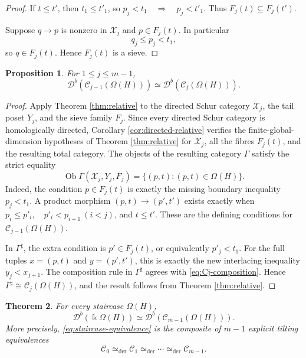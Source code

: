 \documentclass[12pt,a4paper,english,reqno]{amsart}
\theoremstyle{plain}
\newtheorem{theorem}{Theorem}[section]
\newtheorem{proposition}[theorem]{Proposition}
\theoremstyle{definition}
\newcommand{\kk}{\Bbbk}
\newcommand{\C}{\mathcal C}
\newcommand{\X}{\mathcal X}
\newcommand{\G}{\Gamma}
\newcommand{\Gs}{\Gamma^{\sharp}}
\newcommand{\Db}[1]{{\mathscr D}^b(#1)}
\begin{document}
\begin{proof}
If $t\leq t'$, then $t_1\leq t'_1$, so $p_j<t_1\quad\Longrightarrow\quad p_j<t'_1$.
Thus $F_j(t)\subseteq F_j(t')$.

Suppose $q\to p$ is nonzero in $\X_j$ and $p\in F_j(t)$.  In particular
\[
 q_j\leq p_j<t_1,
\]
so $q\in F_j(t)$.  Hence $F_j(t)$ is a sieve.
\end{proof}

\begin{proposition}
\label{prop:one-step}
For $1\leq j\leq m-1$,
\[
 \Db{\C_{j-1}(\Omega(H))}\simeq\Db{\C_j(\Omega(H))}.
\]
\end{proposition}

\begin{proof}
Apply Theorem \ref{thm:relative} to the directed Schur category $\X_j$, the tail
poset $Y_j$, and the sieve family $F_j$.  Since every directed Schur
category is homologically directed, Corollary \ref{cor:directed-relative}
verifies the finite-global-dimension hypotheses of Theorem \ref{thm:relative} for
$\X_j$, all the fibres $F_j(t)$, and the resulting total category.
The objects of the resulting
category $\G$ satisfy the strict equality
\[
 \operatorname{Ob}\G(\X_j,Y_j,F_j)
 =
 \{(p,t):(p,t)\in\Omega(H)\}.
\]
Indeed, the condition $p\in F_j(t)$ is exactly the missing boundary
inequality $p_j<t_1$. A product morphism $(p,t)\to(p',t')$ exists exactly when
 $p_i\leq p'_i,\quad p'_i<p_{i+1}\ (i<j)$, and $t\leq t'$.
These are the defining conditions for
$\C_{j-1}(\Omega(H))$.

In $\Gs$, the extra condition is $p'\in F_j(t)$, or equivalently
$p'_j<t_1$.
For the full tuples $x=(p,t)$ and $y=(p',t')$, this is exactly the new
interlacing inequality $y_j<x_{j+1}$.
The composition rule in $\Gs$ agrees with
\eqref{eq:Cj-composition}.  Hence
$\Gs\cong\C_j(\Omega(H))$, and the result follows from Theorem 
\ref{thm:relative}.
\end{proof}

\begin{theorem}
\label{thm:staircase}
For every staircase $\Omega(H)$,
\begin{equation}
 \Db{\kk\Omega(H)}\simeq\Db{\C_{m-1}(\Omega(H))}.
\label{eq:staircase-equivalence}
\end{equation}
More precisely, \eqref{eq:staircase-equivalence} is the composite of
$m-1$ explicit tilting equivalences
\[
 \C_0\simeq_{\mathrm{der}}\C_1
 \simeq_{\mathrm{der}}\cdots
 \simeq_{\mathrm{der}}\C_{m-1}.
\]
\end{theorem}
\end{document}
